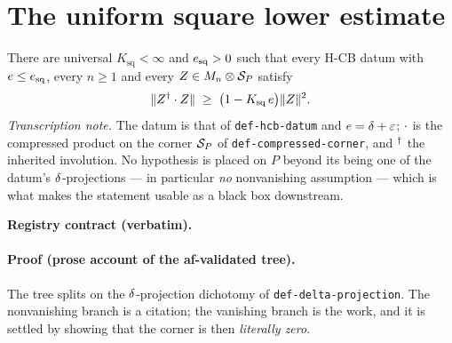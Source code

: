 \section{The uniform square lower estimate}\label{sec:hcb3-uniform-square-lower}

\begin{lemma}\label{lem:hcb3-uniform-square-lower}
There are universal $K_{\mathrm{sq}}<\infty$ and $e_{\mathrm{sq}}>0$ such that every
H-CB datum with $e\le e_{\mathrm{sq}}$, every $n\ge1$ and every
$Z\in M_{n}\otimes \mathcal S_{P}$ satisfy
\begin{equation}\label{eq:usl-main}
  \lVert Z^{\dagger}\mathbin{\cdot} Z\rVert\;\ge\;\bigl(1-K_{\mathrm{sq}}\,e\bigr)\lVert Z\rVert^{2}.
\end{equation}
\emph{Transcription note.} The datum is that of \texttt{def-hcb-datum} and
$e=\delta+\varepsilon$; $\mathbin{\cdot}$ is the compressed product on the corner
$\mathcal S_{P}$ of \texttt{def-compressed-corner}, and $^{\dagger}$ the inherited involution. No
hypothesis is placed on $P$ beyond its being one of the datum's
$\delta$-projections --- in particular \emph{no} nonvanishing assumption --- which is
what makes the statement usable as a black box downstream.
\end{lemma}

\noindent\textbf{Registry contract (verbatim).}

\paragraph{Proof (prose account of the af-validated tree).}
The tree splits on the $\delta$-projection dichotomy of
\texttt{def-delta-projection}. The nonvanishing branch is a citation; the vanishing branch
is the work, and it is settled by showing that the corner is then \emph{literally zero}.

